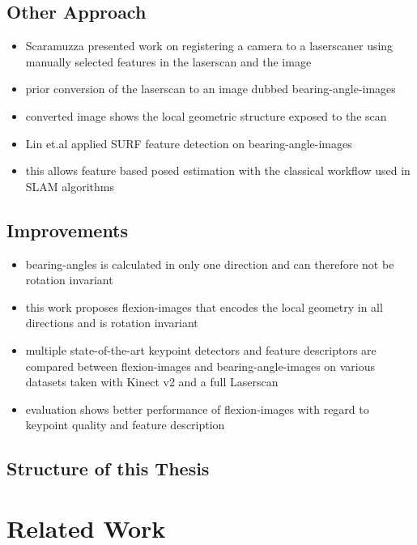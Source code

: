 \subsection{Other Approach}

\begin{itemize}
    \item Scaramuzza\cite{Scaramuzza2007} presented work on registering a camera to a laserscaner using manually selected features in the laserscan and the image
    \item prior conversion of the laserscan to an image dubbed \Glspl{bearing-angle-image}
    \item converted image shows the local geometric structure exposed to the scan

    \item Lin et.al\cite{Lin2017} applied SURF feature detection on \Glspl{bearing-angle-image}
    \item this allows feature based posed estimation with the classical workflow used in SLAM algorithms
\end{itemize}

\subsection{Improvements}

\begin{itemize}
    \item \Glspl{bearing-angle} is calculated in only one direction and can therefore not be rotation invariant
    \item this work proposes \Glspl{flexion-image} that encodes the local geometry in all directions and is rotation invariant
    \item multiple state-of-the-art keypoint detectors and feature descriptors are compared between \Glspl{flexion-image} and \Glspl{bearing-angle-image} on various datasets taken with Kinect v2 and a full Laserscan
    \item evaluation shows better performance of \Glspl{flexion-image} with regard to keypoint quality and feature description
\end{itemize}

\subsection{Structure of this Thesis}

\section{Related Work}

